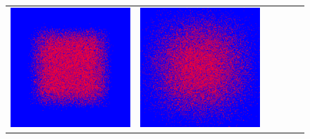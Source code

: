 \documentclass[12pt, reqno]{report}
\theoremstyle{definition}
\theoremstyle{remark}
\begin{document}
\begin{figure}[H]
\begin{tabular}{rccccc}
        \includegraphics[align = c, height=\subheight]{media_paper/diff200.png} & 
        \includegraphics[align = c, height=\subheight]{media_paper/diff500.png} & 

\end{tabular}
\end{figure}
\end{document}
